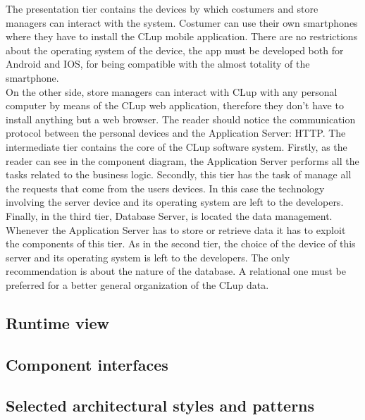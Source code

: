 \documentclass[]{article}
\begin{document}
	\bigskip
	\noindent	
	The presentation tier contains the devices by which costumers and store managers can interact with the system. Costumer can use their own smartphones where they have to install the CLup mobile application. There are no restrictions about the operating system of the device, the app must be developed both for Android and IOS, for being compatible with the almost totality of the smartphone. 
	\\On the other side, store managers can interact with CLup with any personal computer by means of the CLup web application, therefore they don't have to install anything but a web browser.
	The reader should notice the communication protocol between the personal devices and the Application Server: HTTP.
	\newline\newline
	The intermediate tier contains the core of the CLup software system. Firstly, as the reader can see in the component diagram, the Application Server performs all the tasks related to the business logic. 
	Secondly, this tier has the task of manage all the requests that come from the users devices. 
	In this case the technology involving the server device and its operating system are left to the developers.
	\newline\newline
	Finally, in the third tier, Database Server, is located the data management. Whenever the Application Server has to store or retrieve data it has to exploit the components of this tier. As in the second tier, the choice of the device of this server and its operating system is left to the developers. The only recommendation is about the nature of the database. A relational one must be preferred for a better general organization of the CLup data. 
	
	\newpage
	
	
	
	
	
	\subsection{Runtime view}
	\subsection{Component interfaces}
	\subsection{Selected architectural styles and patterns}
	
\end{document}
